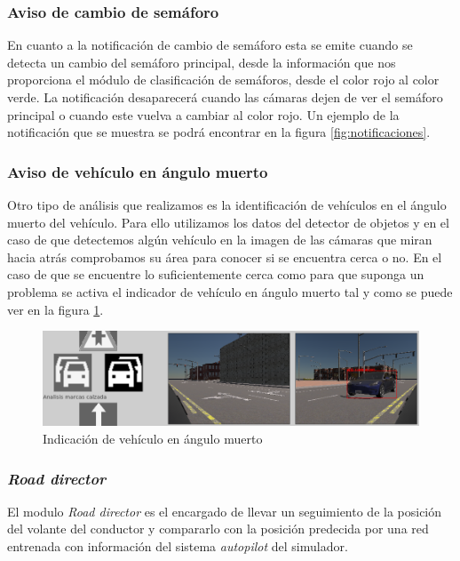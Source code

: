 \subsubsection{Aviso de cambio de semáforo}
En cuanto a la notificación de cambio de semáforo esta se emite cuando se detecta un cambio del semáforo principal, desde la información que nos proporciona el módulo de clasificación de semáforos, desde el color rojo al color verde. La notificación desaparecerá cuando las cámaras dejen de ver el semáforo principal o cuando este vuelva a cambiar al color rojo.
Un ejemplo de la notificación que se muestra se podrá encontrar en la figura \ref{fig:notificaciones}.

\subsubsection{Aviso de vehículo en ángulo muerto}
Otro tipo de análisis que realizamos es la identificación de vehículos en el ángulo muerto del vehículo. Para ello utilizamos los datos del detector de objetos y en el caso de que detectemos algún vehículo en la imagen de las cámaras que miran hacia atrás comprobamos su área para conocer si se encuentra cerca o no.
En el caso de que se encuentre lo suficientemente cerca como para que suponga un problema se activa el indicador de vehículo en ángulo muerto tal y como se puede ver en la figura \ref{fig:angulomuerto}.

\begin{figure}[h!]
    \centering
    \includegraphics[width=\linewidth]{img/angulomuerto.png}
    \caption{Indicación de vehículo en ángulo muerto}
    \label{fig:angulomuerto}    
\end{figure}


\subsubsection{\textit{Road director}} \label{sec:roadDire}
El modulo \textit{Road director} es el encargado de llevar un seguimiento de la posición del volante del conductor y compararlo con la posición predecida por una red entrenada con información del sistema \textit{autopilot} del simulador.

